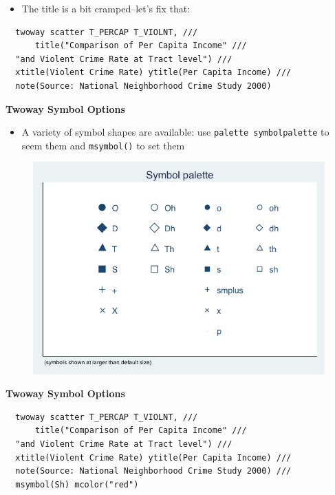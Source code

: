 \documentclass[]{book}
\providecommand{\tightlist}{%
  \setlength{\itemsep}{0pt}\setlength{\parskip}{0pt}}
\begin{document}
\begin{itemize}
\tightlist
\item
  The title is a bit cramped--let's fix that:
\end{itemize}

\begin{verbatim}
  twoway scatter T_PERCAP T_VIOLNT, ///
      title("Comparison of Per Capita Income" ///
  "and Violent Crime Rate at Tract level") ///
  xtitle(Violent Crime Rate) ytitle(Per Capita Income) ///
  note(Source: National Neighborhood Crime Study 2000) 
\end{verbatim}

\textbf{Twoway Symbol Options}

\begin{itemize}
\tightlist
\item
  A variety of symbol shapes are available: use
  \texttt{palette\ symbolpalette} to seem them and \texttt{msymbol()} to
  set them
\end{itemize}

\begin{figure}
\centering
\includegraphics{Stata/StataModGraph/images/Symbol.png}
\caption{}
\end{figure}

\textbf{Twoway Symbol Options}

\begin{verbatim}
  twoway scatter T_PERCAP T_VIOLNT, ///
      title("Comparison of Per Capita Income" ///
  "and Violent Crime Rate at Tract level") ///
  xtitle(Violent Crime Rate) ytitle(Per Capita Income) ///
  note(Source: National Neighborhood Crime Study 2000) ///
  msymbol(Sh) mcolor("red")
\end{verbatim}
\end{document}
